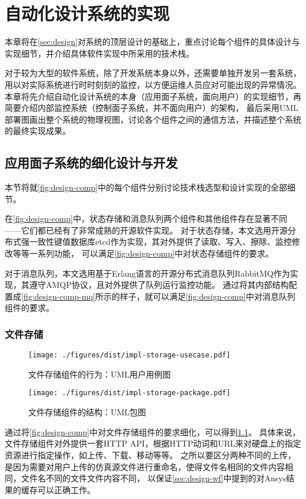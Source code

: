 \documentclass[index]{subfiles}
\begin{document}
\chapter{自动化设计系统的实现}\label{sec:impl}
本章将在\cref{sec:design}对系统的顶层设计的基础上，重点讨论每个组件的具体设计与实现细节，并介绍具体软件实现中所采用的技术栈。

对于较为大型的软件系统，除了开发系统本身以外，还需要单独开发另一套系统，用以对实际系统进行时时刻刻的监控，以方便运维人员应对可能出现的异常情况。
本章将先介绍自动化设计系统的本身（应用面子系统，面向用户）的实现细节，再简要介绍内部监控系统（控制面子系统，并不面向用户）的架构，
最后采用UML部署图画出整个系统的物理视图，讨论各个组件之间的通信方法，并描述整个系统的最终实现成果。

\section{应用面子系统的细化设计与开发}
本节将就\cref{fig:design-comp}中的每个组件分别讨论技术栈选型和设计实现的全部细节。

在\cref{fig:design-comp}中，状态存储和消息队列两个组件和其他组件存在显著不同——它们都已经有了非常成熟的开源软件实现。
对于状态存储，本文选用开源分布式强一致性键值数据库etcd作为实现，其对外提供了读取、写入、擦除、监控修改等等一系列功能，
可以满足\cref{fig:design-comp}中对状态存储组件的要求。

对于消息队列，本文选用基于Erlang语言的开源分布式消息队列RabbitMQ作为实现，其遵守AMQP协议，且对外提供了队列运行监控功能。
通过将其内部结构配置成\cref{fig:design-comp-mq}所示的样子，就可以满足\cref{fig:design-comp}中对消息队列组件的要求。

\subsection{文件存储}
\begin{figure}[h]
  \centering
  \texttt{[image: ./figures/dist/impl-storage-usecase.pdf]}
  \caption{文件存储组件的行为：UML用户用例图\label{fig:impl-storage-usecase}}
\end{figure}
\begin{figure}[h]
  \centering
  \texttt{[image: ./figures/dist/impl-storage-package.pdf]}
  \caption{文件存储组件的结构：UML包图\label{fig:impl-storage-package}}
\end{figure}
通过将\cref{fig:design-comp}中对文件存储组件的要求细化，可以得到\cref{fig:impl-storage-usecase}。
具体来说，文件存储组件对外提供一套HTTP API，根据HTTP动词和URL来对硬盘上的指定资源进行指定操作，如上传、下载、移动等等。
之所以要区分两种不同的上传，是因为需要对用户上传的仿真源文件进行重命名，使得文件名相同的文件内容相同，文件名不同的文件文件内容不同，
以保证\cref{sec:design-wf}中提到的对Ansys结果的缓存可以正确工作。
\end{document}
